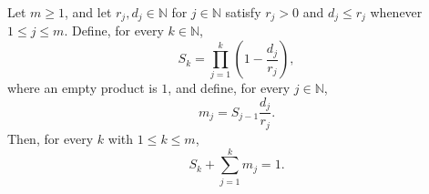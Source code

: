 \begin{theorem}
Let $m\ge1$, and let $r_j,d_j\in\mathbb N$ for $j\in\mathbb N$ satisfy
$r_j>0$ and $d_j\le r_j$ whenever $1\le j\le m$.  Define, for every
$k\in\mathbb N$,
\[
  S_k=\prod_{j=1}^k\left(1-\frac{d_j}{r_j}\right),
\]
where an empty product is $1$, and define, for every $j\in\mathbb N$,
\[
  m_j=S_{j-1}\frac{d_j}{r_j}.
\]
Then, for every $k$ with $1\le k\le m$,
\[
  S_k+\sum_{j=1}^k m_j=1.
\]
\end{theorem}
